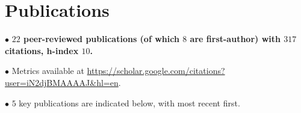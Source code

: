 \documentclass[11pt,a4paper,sans]{moderncv} %
\begin{document}

\vspace{-2.5mm}
\section{Publications}

$\bullet$ \textbf{$22$ peer-reviewed publications (of which $8$ are first-author) with $317$ citations, h-index $10$.} 

$\bullet$ Metrics available at \url{https://scholar.google.com/citations?user=iN2djBMAAAAJ&hl=en}.

$\bullet$ $5$ key publications are indicated below, with most recent first.
\vspace{1pt}
\end{document}
